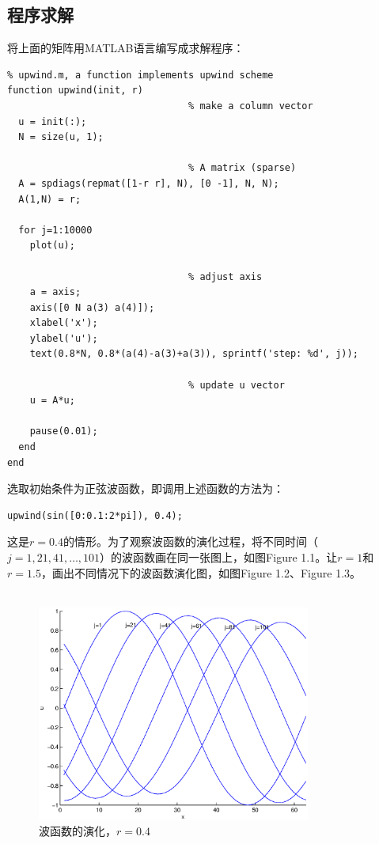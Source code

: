 \documentclass[paper=a4, fontsize=11pt]{scrartcl} %
\numberwithin{equation}{section} %
\numberwithin{figure}{section} %
\numberwithin{table}{section} %
\begin{document}
\begin{CJK*}{UTF8}{gbsn}
\subsection{程序求解}

将上面的矩阵用MATLAB语言编写成求解程序：
\lstset{language=MATLAB}
\begin{lstlisting}
% upwind.m, a function implements upwind scheme 
function upwind(init, r)
                                % make a column vector
  u = init(:);
  N = size(u, 1);

                                % A matrix (sparse)
  A = spdiags(repmat([1-r r], N), [0 -1], N, N);
  A(1,N) = r;

  for j=1:10000
    plot(u);

                                % adjust axis
    a = axis;
    axis([0 N a(3) a(4)]);
    xlabel('x');
    ylabel('u');
    text(0.8*N, 0.8*(a(4)-a(3)+a(3)), sprintf('step: %d', j));

                                % update u vector
    u = A*u;

    pause(0.01);
  end
end
\end{lstlisting}


选取初始条件为正弦波函数，即调用上述函数的方法为：
\lstset{language=MATLAB}
\begin{lstlisting}
upwind(sin([0:0.1:2*pi]), 0.4);
\end{lstlisting}

这是$r=0.4$的情形。为了观察波函数的演化过程，将不同时间（$j=1,21,41,\dots,101$）的波函数画在同一张图上，如图Figure 1.1。让$r=1$和$r=1.5$，画出不同情况下的波函数演化图，如图Figure 1.2、Figure 1.3。\\\\
\begin{figure}[H]
\centering
\includegraphics[width=90mm]{figure1-1.eps}
\caption{波函数的演化，$r=0.4$}
\end{figure}


\end{CJK*}
\end{document}

